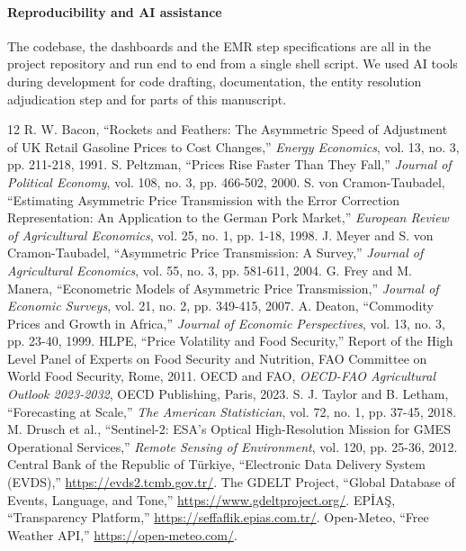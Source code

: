 \documentclass[conference]{IEEEtran}
\begin{document}
\paragraph{Reproducibility and AI assistance} The codebase, the dashboards and the EMR step specifications are all in the project repository and run end to end from a single shell script. We used AI tools during development for code drafting, documentation, the entity resolution adjudication step and for parts of this manuscript.

\begin{thebibliography}{12}
 R. W. Bacon, ``Rockets and Feathers: The Asymmetric Speed of Adjustment of UK Retail Gasoline Prices to Cost Changes,'' \textit{Energy Economics}, vol. 13, no. 3, pp. 211-218, 1991.
 S. Peltzman, ``Prices Rise Faster Than They Fall,'' \textit{Journal of Political Economy}, vol. 108, no. 3, pp. 466-502, 2000.
 S. von Cramon-Taubadel, ``Estimating Asymmetric Price Transmission with the Error Correction Representation: An Application to the German Pork Market,'' \textit{European Review of Agricultural Economics}, vol. 25, no. 1, pp. 1-18, 1998.
 J. Meyer and S. von Cramon-Taubadel, ``Asymmetric Price Transmission: A Survey,'' \textit{Journal of Agricultural Economics}, vol. 55, no. 3, pp. 581-611, 2004.
 G. Frey and M. Manera, ``Econometric Models of Asymmetric Price Transmission,'' \textit{Journal of Economic Surveys}, vol. 21, no. 2, pp. 349-415, 2007.
 A. Deaton, ``Commodity Prices and Growth in Africa,'' \textit{Journal of Economic Perspectives}, vol. 13, no. 3, pp. 23-40, 1999.
 HLPE, ``Price Volatility and Food Security,'' Report of the High Level Panel of Experts on Food Security and Nutrition, FAO Committee on World Food Security, Rome, 2011.
 OECD and FAO, \textit{OECD-FAO Agricultural Outlook 2023-2032}, OECD Publishing, Paris, 2023.
 S. J. Taylor and B. Letham, ``Forecasting at Scale,'' \textit{The American Statistician}, vol. 72, no. 1, pp. 37-45, 2018.
 M. Drusch et al., ``Sentinel-2: ESA's Optical High-Resolution Mission for GMES Operational Services,'' \textit{Remote Sensing of Environment}, vol. 120, pp. 25-36, 2012.
 Central Bank of the Republic of Türkiye, ``Electronic Data Delivery System (EVDS),'' \url{https://evds2.tcmb.gov.tr/}.
 The GDELT Project, ``Global Database of Events, Language, and Tone,'' \url{https://www.gdeltproject.org/}.
 EPİAŞ, ``Transparency Platform,'' \url{https://seffaflik.epias.com.tr/}.
 Open-Meteo, ``Free Weather API,'' \url{https://open-meteo.com/}.
\end{thebibliography}
\end{document}
